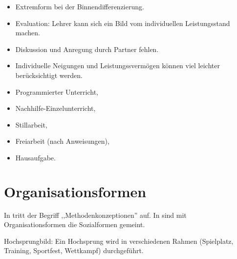 \begin{itemize}
\item Extremform bei der Binnendifferenzierung.
\item Evaluation: Lehrer kann sich ein Bild vom individuellen
Leistungsstand  machen.
\item Diskussion und Anregung durch Partner fehlen.
\item Individuelle Neigungen und Leistungssverm\"{o}gen k\"{o}nnen viel
leichter ber\"{u}cksichtigt werden.
\end{itemize}

\begin{beisp2}
	\begin{itemize}
		\item Programmierter Unterricht,
		\item Nachhilfe-Einzelunterricht,
		\item Stillarbeit, 
		\item Freiarbeit (nach Anweisungen),
		\item Hausaufgabe.
	\end{itemize}
\end{beisp2}

\bip\bip
\section{Organisationsformen}\label{Orga}

In \cite[S.\ 97]{DuitHausslerKircher} tritt der Begriff
,,Methodenkonzeptionen'' auf.
In \cite{BleichrothDahnckeJung} sind mit Organisationsformen
die Sozialformen gemeint.

\mip Hochsprungbild: Ein Hochsprung wird in verschiedenen
Rahmen (Spielplatz, Training, Sportfest, Wettkampf) durchgef\"{u}hrt.


